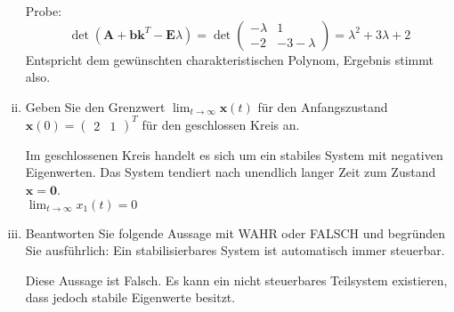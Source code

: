 \documentclass[crop=false]{standalone}
\begin{document}
\begin{task}
\begin{enumerate}[i.]
\begin{solution}
Probe:
\[ \det (\mathbf{A} + \mathbf{b}\mathbf{k}^T - \mathbf{E}\lambda) = 
\det \begin{pmatrix} -\lambda & 1 \\ -2 & -3-\lambda \end{pmatrix} = \lambda^2 + 3 \lambda + 2\]
Entspricht dem gewünschten charakteristischen Polynom, Ergebnis stimmt also.
\end{solution}
  \item Geben Sie den Grenzwert $\lim _{t \rightarrow \infty} \mathbf{x}(t)$ für den Anfangszustand $\mathbf{x}(0)=\begin{pmatrix}2 & 1\end{pmatrix}^{T}$ für den geschlossen Kreis an.
\begin{solution}
Im geschlossenen Kreis handelt es sich um ein stabiles System mit negativen Eigenwerten. Das System tendiert nach unendlich langer Zeit zum Zustand $\mathbf{x} = \mathbf{0}$.\\
$\lim _{t \rightarrow \infty} x_{1}(t) = 0$
\end{solution}
  \item Beantworten Sie folgende Aussage mit WAHR oder FALSCH und begründen Sie ausführlich: Ein stabilisierbares System ist automatisch immer steuerbar.
\begin{solution}
Diese Aussage ist Falsch. Es kann ein nicht steuerbares Teilsystem existieren, dass jedoch stabile Eigenwerte besitzt.
\end{solution}
\end{enumerate}
\end{task}
\end{document}
